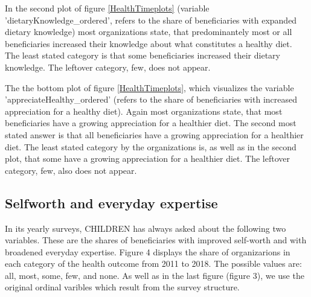 \documentclass[12pt, a4paper, titlepage]{article}\usepackage[]{graphicx}\usepackage[]{color}
\begin{document}
In the second plot of figure \ref{HealthTimeplots} (variable 'dietaryKnowledge\_ordered', refers to the share of beneficiaries with expanded dietary knowledge) most organizations state, that predominantely most or all beneficiaries increased their knowledge about what constitutes a healthy diet. The least stated category is that some beneficiaries increased their dietary knowledge. The leftover category, few, does not appear.

The the bottom plot of figure \ref{HealthTimeplots}, which visualizes the variable 'appreciateHealthy\_ordered' (refers to the share of beneficiaries with increased appreciation for a healthy diet). Again most organizations state, that most beneficiaries have a growing appreciation for a healthier diet. The second most stated answer is that all beneficiaries have a growing appreciation for a healthier diet. The least stated category by the organizations is, as well as in the second plot, that some have a growing appreciation for a healthier diet. The leftover category, few, also does not appear.


\subsection{Selfworth and everyday expertise} 

In its yearly surveys, CHILDREN has always asked about the following two variables. These are the shares of beneficiaries with improved self-worth and with broadened everyday expertise. Figure 4 displays the share of organizarions in each category of the health outcome from 2011 to 2018. The possible values are: all, most, some, few, and none. As well as in the last figure (figure 3), we use the original ordinal varibles which result from the survey structure.
\end{document}
